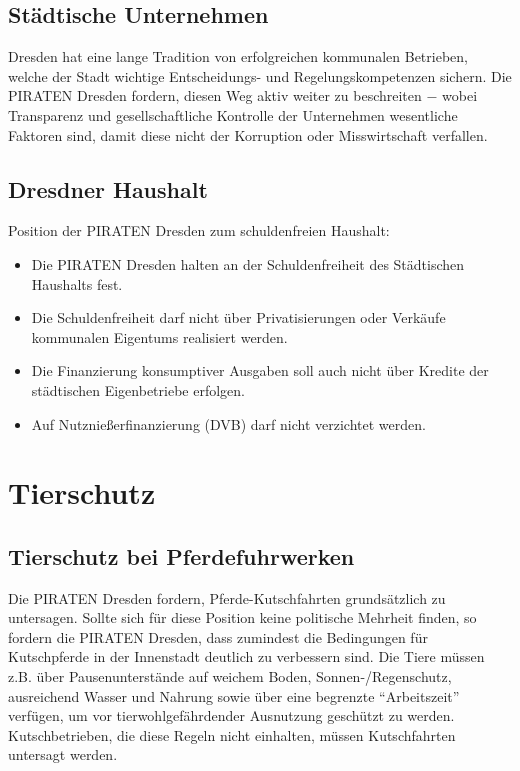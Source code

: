 \documentclass[a4paper, 11pt]{article}
\begin{document}
\subsection{Städtische Unternehmen}
Dresden hat eine lange Tradition von erfolgreichen kommunalen Betrieben, welche der Stadt wichtige Entscheidungs- und Regelungskompetenzen sichern. Die PIRATEN Dresden fordern, diesen Weg aktiv weiter zu beschreiten $-$ wobei Transparenz und gesellschaftliche Kontrolle der Unternehmen wesentliche Faktoren sind, damit diese nicht der Korruption oder Misswirtschaft verfallen.


\subsection{Dresdner Haushalt}

Position der PIRATEN Dresden zum schuldenfreien Haushalt:

\begin{itemize}
    \item Die PIRATEN Dresden halten an der Schuldenfreiheit des Städtischen Haushalts fest.
    \item Die Schuldenfreiheit darf nicht über Privatisierungen oder Verkäufe kommunalen Eigentums realisiert werden.
    \item Die Finanzierung konsumptiver Ausgaben soll auch nicht über Kredite der städtischen Eigenbetriebe erfolgen.
    \item Auf Nutznießerfinanzierung (DVB) darf nicht verzichtet werden.
\end{itemize}

\section{Tierschutz}

\subsection{Tierschutz bei Pferdefuhrwerken}
Die PIRATEN Dresden fordern, Pferde-Kutschfahrten grundsätzlich zu untersagen. Sollte sich für diese Position keine politische Mehrheit finden, so fordern die PIRATEN Dresden, dass zumindest die Bedingungen für Kutschpferde in der Innenstadt deutlich zu verbessern sind. Die Tiere müssen z.B. über Pausenunterstände auf weichem Boden, Sonnen-/Regenschutz, ausreichend Wasser und Nahrung sowie über eine begrenzte ``Arbeitszeit'' verfügen, um vor tierwohlgefährdender Ausnutzung geschützt zu werden. Kutschbetrieben, die diese Regeln nicht einhalten, müssen Kutschfahrten untersagt werden.
\end{document}
